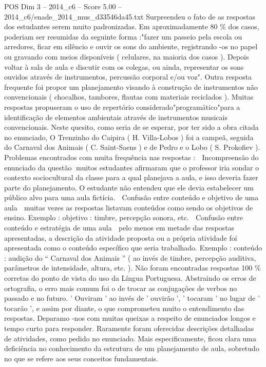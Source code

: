\begin{textsample}{POS Dim 3 – 2014\_c6 – Score 5.00 – 2014\_c6/enade\_2014\_mus\_d33546da45.txt}
Surpreendeu o fato de as respostas dos estudantes serem muito padronizadas.
Em aproximadamente 80 \% dos casos, poderiam ser resumidas da seguinte forma :"fazer um passeio pela escola ou arredores, ficar em silêncio e ouvir os sons do ambiente, registrando -os no papel ou gravando com meios disponíveis ( celulares, na maioria dos casos ).
Depois voltar à sala de aula e discutir com os colegas, ou ainda, representar os sons ouvidos através de instrumentos, percussão corporal e/ou voz".
Outra resposta frequente foi propor um planejamento visando à construção de instrumentos não convencionais ( chocalhos, tambores, flautas com materiais reciclados ).
Muitas respostas propuseram o uso de repertório considerado"programático"para a identificação de elementos ambientais através de instrumentos musicais convencionais.
Neste quesito, como seria de se esperar, por ter sido a obra citada no enunciado, O Trenzinho do Caipira ( H.
Villa-Lobos ) foi a campeã, seguida do Carnaval dos Animais ( C.
Saint-Saens ) e de Pedro e o Lobo ( S.
Prokofiev ).
Problemas encontrados com muita frequência nas respostas :  Incompreensão do enunciado da questão muitos estudantes afirmaram que o professor iria sondar o contexto sociocultural da classe para a qual planejava a aula, e isso deveria fazer parte do planejamento.
O estudante não entendeu que ele devia estabelecer um público alvo para uma aula fictícia.  Confusão entre conteúdo e objetivo de uma aula  muitas vezes as respostas listavam conteúdos como sendo os objetivos de ensino.
Exemplo : objetivo : timbre, percepção sonora, etc.  Confusão entre conteúdo e estratégia de uma aula  pelo menos em metade das respostas apresentadas, a descrição da atividade proposta ou a própria atividade foi apresentada como o conteúdo específico que seria trabalhado.
Exemplo : conteúdo : audição do “ Carnaval dos Animais ” ( ao invés de timbre, percepção auditiva, parâmetros de intensidade, altura, etc. ).
Não foram encontradas respostas 100 \% corretas do ponto de vista do uso da Língua Portuguesa.
Abstraindo os erros de ortografia, o erro mais comum foi o de trocar as conjugações de verbos no passado e no futuro. ' Ouviram ' ao invés de ' ouvirão ', ' tocaram ' no lugar de ' tocarão ', e assim por diante, o que comprometeu muito o entendimento das respostas.
Deparamo -nos com muitas queixas a respeito de enunciados longos e tempo curto para responder.
Raramente foram oferecidas descrições detalhadas de atividades, como pedido no enunciado.
Mais especificamente, ficou clara uma deficiência no conhecimento da estrutura de um planejamento de aula, sobretudo no que se refere aos seus conceitos fundamentais.

\end{textsample}

